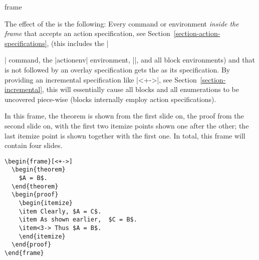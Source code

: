 \begin{environment}{{frame}}
\begin{frame}[<+->][plain]
\begin{frame}[plain]
  The effect of the  is the following: Every command or environment \emph{inside the frame} that accepts an action specification, see Section~\ref{section-action-specifications}, (this includes the |\item| command, the |actionenv| environment, |\action|, and all block environments) and that is not followed by an overlay specification gets the  as its specification. By providing an incremental specification like |<+->|, see Section~\ref{section-incremental}, this will essentially cause all blocks and all enumerations to be uncovered piece-wise (blocks internally employ action specifications).

  \example
  In this frame, the theorem is shown from the first slide on, the proof from the second slide on, with the first two itemize points shown one after the other; the last itemize point is shown together with the first one. In total, this frame will contain four slides.

\begin{verbatim}
\begin{frame}[<+->]
  \begin{theorem}
    $A = B$.
  \end{theorem}
  \begin{proof}
    \begin{itemize}
    \item Clearly, $A = C$.
    \item As shown earlier,  $C = B$.
    \item<3-> Thus $A = B$.
    \end{itemize}
  \end{proof}
\end{frame}
\end{verbatim}


\end{frame}
\end{frame}
\end{environment}
